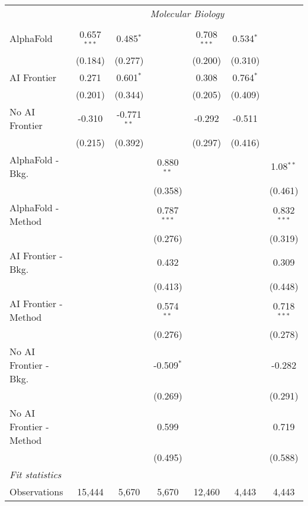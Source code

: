 \begin{tabular}{lcccccc}
 & \multicolumn{6}{c}{\textit{Molecular Biology}} \\ \\
   AlphaFold               & 0.657$^{***}$ & 0.485$^{*}$   &               & 0.708$^{***}$ & 0.534$^{*}$ &   \\   
                           & (0.184)       & (0.277)       &               & (0.200)       & (0.310)     &   \\   
   AI Frontier             & 0.271         & 0.601$^{*}$   &               & 0.308         & 0.764$^{*}$ &   \\   
                           & (0.201)       & (0.344)       &               & (0.205)       & (0.409)     &   \\   
   No AI Frontier          & -0.310        & -0.771$^{**}$ &               & -0.292        & -0.511      &   \\   
                           & (0.215)       & (0.392)       &               & (0.297)       & (0.416)     &   \\   
   AlphaFold - Bkg.        &               &               & 0.880$^{**}$  &               &             & 1.08$^{**}$\\   
                           &               &               & (0.358)       &               &             & (0.461)\\   
   AlphaFold - Method      &               &               & 0.787$^{***}$ &               &             & 0.832$^{***}$\\   
                           &               &               & (0.276)       &               &             & (0.319)\\   
   AI Frontier - Bkg.      &               &               & 0.432         &               &             & 0.309\\   
                           &               &               & (0.413)       &               &             & (0.448)\\   
   AI Frontier - Method    &               &               & 0.574$^{**}$  &               &             & 0.718$^{***}$\\   
                           &               &               & (0.276)       &               &             & (0.278)\\   
   No AI Frontier - Bkg.   &               &               & -0.509$^{*}$  &               &             & -0.282\\   
                           &               &               & (0.269)       &               &             & (0.291)\\   
   No AI Frontier - Method &               &               & 0.599         &               &             & 0.719\\   
                           &               &               & (0.495)       &               &             & (0.588)\\   
   \midrule
   \emph{Fit statistics}\\
   Observations            & 15,444        & 5,670         & 5,670         & 12,460        & 4,443       & 4,443\\  
   

\end{tabular}
